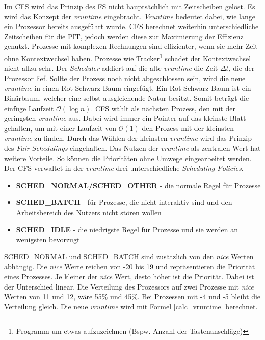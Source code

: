 Im CFS wird das Prinzip des FS nicht hauptsächlich mit Zeitscheiben gelöst. Es wird das Konzept der \textit{vruntime} eingebracht. \textit{Vruntime} bedeutet dabei, wie lange ein Prozessor bereits ausgeführt wurde. CFS berechnet weiterhin unterschiedliche Zeitscheiben für die PIT, jedoch werden diese zur Maximierung der Effizienz genutzt. Prozesse mit komplexen Rechnungen sind effizienter, wenn sie mehr Zeit ohne Kontextwechsel haben. Prozesse wie Tracker\footnote{Programm um etwas aufzuzeichnen (Bspw. Anzahl der Tastenanschläge)} schadet der Kontextwechsel nicht allzu sehr. Der \textit{Scheduler} addiert auf die alte \textit{vruntime} die Zeit $\Delta t$, die der Prozessor lief. Sollte der Prozess noch nicht abgeschlossen sein, wird die neue \textit{vruntime} in einen Rot-Schwarz Baum eingefügt. Ein Rot-Schwarz Baum ist ein Binärbaum, welcher eine selbst ausgleichende Natur besitzt. Somit beträgt die einfüge Laufzeit $\mathcal{O}(\log n)$. CFS wählt als nächsten Prozess, den mit der geringsten \textit{vruntime} aus. Dabei wird immer ein Pointer auf das kleinste Blatt gehalten, um mit einer Laufzeit von $\mathcal{O}(1)$ den Prozess mit der kleinsten \textit{vruntime} zu finden. Durch das Wählen der kleinsten \textit{vruntime} wird das Prinzip des \textit{Fair Schedulings} eingehalten. \cite[Ab 5:22]{CFS:Rebeiro}
\medskip
\newpage
Das Nutzen der \textit{vruntime} als zentralen Wert hat weitere Vorteile. So können die Prioritäten ohne Umwege eingearbeitet werden. Der CFS verwaltet in der \textit{vruntime} drei unterschiedliche \textit{Scheduling Policies}. \cite{LinuxDoc:Torvalds}
\begin{itemize}
    \item \textbf{SCHED\_NORMAL/SCHED\_OTHER} - die normale Regel für Prozesse
    \item \textbf{SCHED\_BATCH} - für Prozesse, die nicht interaktiv sind und den Arbeitsbereich des Nutzers nicht stören wollen
    \item \textbf{SCHED\_IDLE} - die niedrigste Regel für Prozesse und sie werden an wenigsten bevorzugt
\end{itemize}
SCHED\_NORMAL und SCHED\_BATCH sind zusätzlich von den \textit{nice} Werten abhängig. Die \textit{nice} Werte reichen von -20 bis 19 und repräsentieren die Priorität eines Prozesses. Je kleiner der \textit{nice} Wert, desto höher ist die Priorität\cite{Scheduler:Kerrisk}. Dabei ist der Unterschied linear. Die Verteilung des Prozessors auf zwei Prozesse mit \textit{nice} Werten von 11 und 12, wäre 55\% und 45\%. Bei Prozessen mit -4 und -5 bleibt die Verteilung gleich. Die neue \textit{vruntime} wird mit Formel \ref{calc_vruntime}\cite{LinuxKernel:Torvalds} berechnet.
